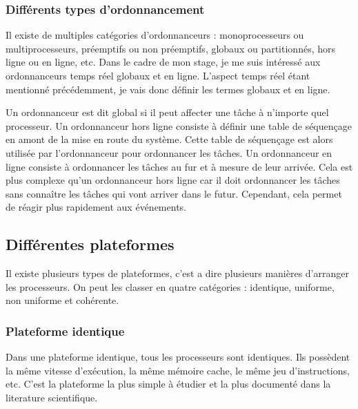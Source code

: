 \subsubsection{Différents types d'ordonnancement}

Il existe de multiples catégories d'ordonnanceurs : monoprocesseurs ou multiprocesseurs, préemptifs ou non préemptifs, globaux ou partitionnés, hors ligne ou en ligne, etc. Dans le cadre de mon stage, je me suis intéressé aux ordonnanceurs temps réel globaux et en ligne. L'aspect temps réel étant mentionné précédemment, je vais donc définir les termes globaux et en ligne. 

Un ordonnanceur est dit global si il peut affecter une tâche à n'importe quel processeur. Un ordonnanceur hors ligne consiste à définir une table de séquençage en amont de la mise en route du système. Cette table de séquençage est alors utilisée par l'ordonnanceur pour ordonnancer les tâches. Un ordonnanceur en ligne consiste à ordonnancer les tâches au fur et à mesure de leur arrivée. Cela est plus complexe qu'un ordonnanceur hors ligne car il doit ordonnancer les tâches sans connaître les tâches qui vont arriver dans le futur. Cependant, cela permet de réagir plus rapidement aux événements.


\subsection{Différentes plateformes}

Il existe plusieurs types de plateformes, c'est a dire plusieurs manières d’arranger les processeurs. On peut les classer en quatre catégories : identique, uniforme, non uniforme et cohérente.
\subsubsection{Plateforme identique}
Dans une plateforme identique, tous les processeurs sont identiques. Ils possèdent la même vitesse d'exécution, la même mémoire cache, le même jeu d'instructions, etc. C'est la plateforme la plus simple à étudier et la plus documenté dans la literature scientifique. 


